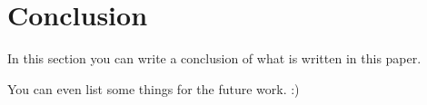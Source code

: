 \section{Conclusion}

In this section you can write a conclusion of what is written
in this paper.

You can even list some things for the future work. :)
